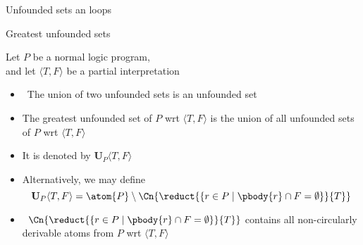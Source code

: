 \begin{frame}{Unfounded sets an loops}

\end{frame}
\begin{frame}{Greatest unfounded sets}\label{unf:greatest}

Let $P$ be a normal logic program,\\ and let
$\langle T,F \rangle$ be a partial interpretation

\begin{itemize}
\item<2->  \ The union of two unfounded sets is an unfounded set
\item<3-> The \alert{greatest unfounded set} of $P$ wrt $\langle T,F \rangle$ is the
  union of all unfounded sets of $P$ wrt $\langle T,F \rangle$
\item<4-> [] It is denoted by $\mathbf{U}_P\langle T,F \rangle$
\item<5-> Alternatively, we may define
  \[
  \mathbf{U}_P\langle T,F \rangle =
  \atom{P} \setminus
  \Cn{\reduct{\{r \in P \mid \pbody{r} \cap F = \emptyset\}}{T}}\/
  \]
\item<6->  \
  \(
  \Cn{\reduct{\{r \in P \mid \pbody{r} \cap F = \emptyset\}}{T}}
  \)
  contains all non-circularly derivable atoms from $P$ wrt $\langle T,F \rangle$
\end{itemize}
\end{frame}
%
